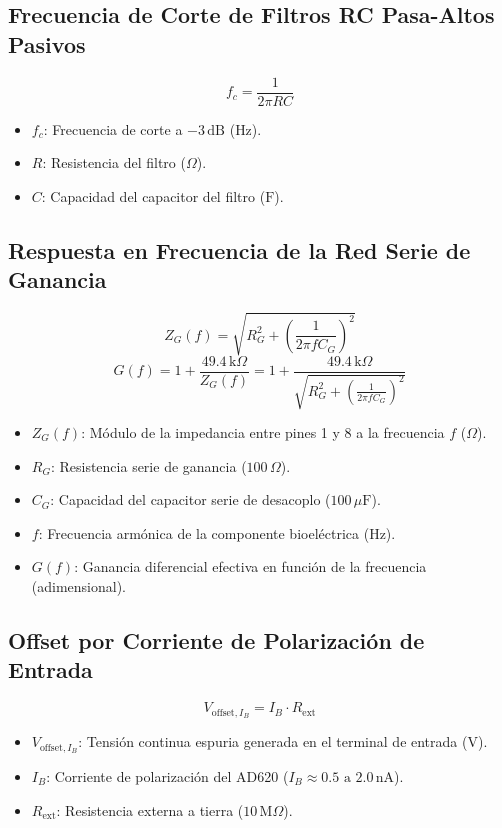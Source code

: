 \documentclass[11pt,a4paper]{article}
\begin{document}
\subsection{Frecuencia de Corte de Filtros RC Pasa-Altos Pasivos}
\begin{equation}
f_c = \frac{1}{2\pi R C}
\end{equation}
\begin{itemize}
    \item $f_c$: Frecuencia de corte a $-3\,\text{dB}$ ($\text{Hz}$).
    \item $R$: Resistencia del filtro ($\Omega$).
    \item $C$: Capacidad del capacitor del filtro ($\text{F}$).
\end{itemize}

\subsection{Respuesta en Frecuencia de la Red Serie de Ganancia}
\begin{equation}
Z_G(f) = \sqrt{R_G^2 + \left( \frac{1}{2\pi f C_G} \right)^2}
\end{equation}
\begin{equation}
G(f) = 1 + \frac{49.4\,\text{k}\Omega}{Z_G(f)} = 1 + \frac{49.4\,\text{k}\Omega}{\sqrt{R_G^2 + \left(\frac{1}{2\pi f C_G}\right)^2}}
\end{equation}
\begin{itemize}
    \item $Z_G(f)$: Módulo de la impedancia entre pines 1 y 8 a la frecuencia $f$ ($\Omega$).
    \item $R_G$: Resistencia serie de ganancia ($100\,\Omega$).
    \item $C_G$: Capacidad del capacitor serie de desacoplo ($100\,\mu\text{F}$).
    \item $f$: Frecuencia armónica de la componente bioeléctrica ($\text{Hz}$).
    \item $G(f)$: Ganancia diferencial efectiva en función de la frecuencia (adimensional).
\end{itemize}

\subsection{Offset por Corriente de Polarización de Entrada}
\begin{equation}
V_{\text{offset}, I_B} = I_B \cdot R_{\text{ext}}
\end{equation}
\begin{itemize}
    \item $V_{\text{offset}, I_B}$: Tensión continua espuria generada en el terminal de entrada ($\text{V}$).
    \item $I_B$: Corriente de polarización del AD620 ($I_B \approx 0.5\text{ a } 2.0\,\text{nA}$).
    \item $R_{\text{ext}}$: Resistencia externa a tierra ($10\,\text{M}\Omega$).
\end{itemize}
\end{document}
